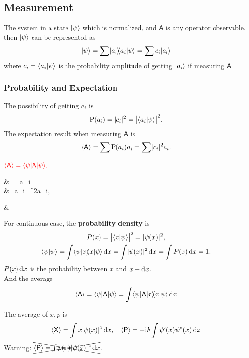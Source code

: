 \documentclass{article}
\newcommand*{\op}[1]{\mathsf{#1}}
\newcommand{\ko}[1]{\hspace{-#1 pt}}
\newcommand{\spark}[1]{\textcolor{red}{#1}}
\begin{document}
\subsection{Measurement}
The system in a state $\lvert\psi\rangle$ which is normalized, and $\op{A}$ is any operator observable,
then $\lvert\psi\rangle$ can be represented as
$$\ket\psi=\sum\ket{a_i}\ko3\brkt{a_i}\psi=\sum c_i\ket{a_i}$$
where $c_i=\langle a_i\vert\psi\rangle$ is the probability amplitude of getting $\lvert a_i\rangle$ if measuring $\op{A}$.
\subsubsection{Probability and Expectation}
The possibility of getting $a_i$ is
$$\operatorname{P}(a_i)=\lvert c_i\rvert^2=\bigl\lvert\langle a_i\vert\psi\rangle\bigr\rvert^2.$$
The expectation result when measuring $\op{A}$ is
$$\ave{\op{A}}=\sum \P(a_i)a_i=\sum\abs{c_i}^2a_i.$$
\begin{theorem}{}{}
	\centering$\spark{\ave{\op{A}}=\bra\psi\op{A}\ket\psi.}$
	\begin{flalign*}
		\begin{split}
			\bra\psi\op{A}\ket\psi&=\sum\bra\psi\op{A}\ko3\psi=\sum\bra\psi a_i\ko3\psi\\
			&=\sum a_i\brkt{}\psi=\sum{}^2a_i,
		\end{split}&
	\end{flalign*}
\end{theorem}
For continuous case, the \textbf{probability density} is
\begin{gather*}
	P(x)=\bigabs{\brkt x\psi}^2=\abs{\psi(x)}^2,\\
	\brkt\psi\psi=\int\brkt\psi{x}\ko3\brkt x\psi\d x=\int\abs{\psi(x)}^2\d x=\int P(x)\d x=1.
\end{gather*}
$P(x)\mathop{}\!\mathrm{d} x$ is the probability between $x$ and $x+\mathop{}\!\mathrm{d} x$.\\
And the average
$$\ave{\op{A}}=\bra\psi\op{A}\ket\psi=\int\bra\psi\op{A}\ket x\ko3\brkt x\psi\d x$$
\begin{example}{}{}
	The average of $x,p$ is
	$$\ave{\op{X}}=\int x\abs{\psi(x)}^2\d x,\quad\ave{\op{P}}=-\i\hbar\int\psi'(x) \psi\conj(x)\d x$$
	Warning: $\xcancel{\ave{\op{P}}=\int p(x)\abs{\psi(x)}^2\d x}$.
\end{example}
\end{document}

